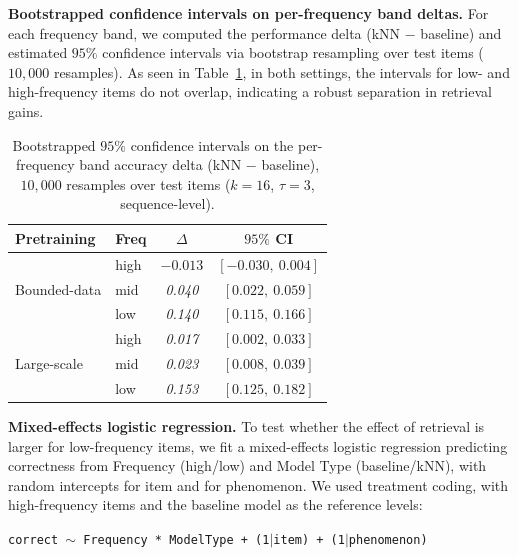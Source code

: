 \noindent \textbf{Bootstrapped confidence intervals on per-frequency band deltas.}
For each frequency band, we computed the performance delta (kNN $-$ baseline) and estimated $95\%$ confidence intervals via bootstrap resampling over test items ($10{,}000$ resamples). As seen in Table~\ref{tab:boot_ci}, in both settings, the intervals for low- and high-frequency items do not overlap, indicating a robust separation in retrieval gains.

\begin{table}[ht]
\centering
\small
\caption{Bootstrapped $95\%$ confidence intervals on the per-frequency band accuracy delta (kNN $-$ baseline), $10{,}000$ resamples over test items ($k=16$, $\tau=3$, sequence-level).}
\label{tab:boot_ci}
\begin{tabular}{llcc}
\toprule
Pretraining & Freq & $\Delta$ & $95\%$ CI \\
\midrule
\multirow{3}{*}{Bounded-data}
& high & \textit{$-0.013$} & \textit{$[-0.030,\ 0.004]$} \\
& mid  & \textit{0.040}    & \textit{$[0.022,\ 0.059]$} \\
& low  & \textit{0.140}    & \textit{$[0.115,\ 0.166]$} \\
\multirow{3}{*}{Large-scale}
& high & \textit{0.017}    & \textit{$[0.002,\ 0.033]$} \\
& mid  & \textit{0.023}    & \textit{$[0.008,\ 0.039]$} \\
& low  & \textit{0.153}    & \textit{$[0.125,\ 0.182]$} \\
\bottomrule
\end{tabular}
\end{table}

\noindent \textbf{Mixed-effects logistic regression.}
To test whether the effect of retrieval is larger for low-frequency items, we fit a mixed-effects logistic regression predicting correctness from Frequency (high/low) and Model Type (baseline/kNN), with random intercepts for item and for phenomenon. We used treatment coding, with high-frequency items and the baseline model as the reference levels:
\begin{center}
\texttt{correct $\sim$ Frequency * ModelType + (1$\mid$item) + (1$\mid$phenomenon)}
\end{center}

